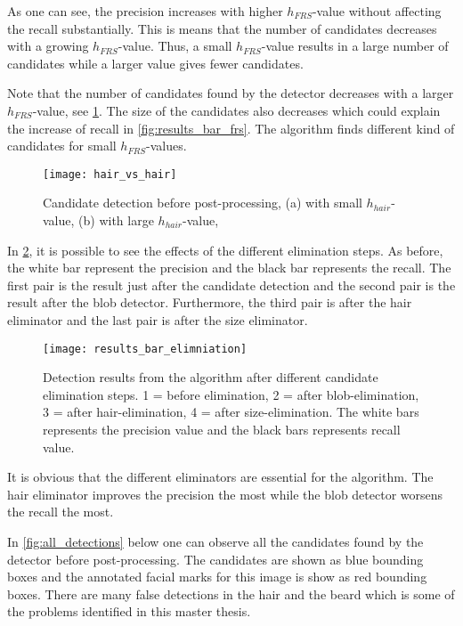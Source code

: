 As one can see, the precision increases with higher $h_{FRS}$-value without affecting the recall substantially. This is means that the number of candidates decreases with a growing $h_{FRS}$-value. Thus, a small $h_{FRS}$-value results in a large number of candidates while a larger value gives fewer candidates.

Note that the number of candidates found by the detector decreases with a larger $h_{FRS}$-value, see \cref{fig:hair_vs_hair}. The size of the candidates also decreases which could explain the increase of recall in \cref{fig:results_bar_frs}. The algorithm finds different kind of candidates for small $h_{FRS}$-values. 

\FloatBarrier
\begin{figure}[h!]
	\centering
	\texttt{[image: hair\_vs\_hair]}
	\caption{Candidate detection before post-processing, (a) with small $h_{hair}$-value, (b) with large $h_{hair}$-value,   \label{fig:hair_vs_hair}}
\end{figure}
\FloatBarrier

In \cref{fig:results_bar_elimniation}, it is possible to see the effects of the different elimination steps. As before, the white bar represent the precision and the black bar represents the recall. The first pair is the result just after the candidate detection and the second pair is the result after the blob detector. Furthermore, the third pair is after the hair eliminator and the last pair is after the size eliminator. 

\FloatBarrier
\begin{figure}[h!]
	\centering
	\texttt{[image: results\_bar\_elimniation]}
	\caption{Detection results from the algorithm  after different candidate elimination steps. 1 = before elimination, 2 = after blob-elimination, 3 = after hair-elimination, 4 = after size-elimination. The white bars represents the precision value and the black bars represents recall value.  \label{fig:results_bar_elimniation}}
\end{figure}
\FloatBarrier

It is obvious that the different eliminators are essential for the algorithm. The hair eliminator improves the precision the most while the blob detector worsens the recall the most.     


In \cref{fig:all_detections} below one can observe all the candidates found by the detector before post-processing. The candidates are shown as blue bounding boxes and the annotated facial marks for this image is show as red bounding boxes. There are many false detections in the hair and the beard which is some of the problems identified in this master thesis. 

